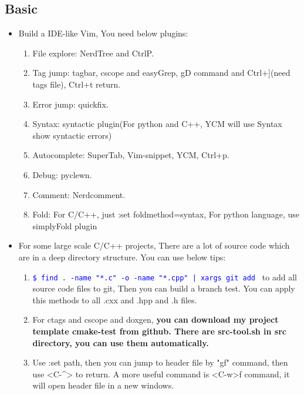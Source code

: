 \documentclass[a4paper,12pt,twoside]{book}
\newcommand{\linuxcommand}[1]{\texttt{\textcolor{blue}{\$ #1 \Pisymbol{psy}{191}}}}
\begin{document}
\subsection{Basic}
\begin{itemize}
		\item Build a IDE-like Vim, You need below plugins:
		\begin{enumerate}
				\item File explore: NerdTree and CtrlP.

				\item Tag jump: tagbar, cscope and easyGrep, gD command and Ctrl+](need tags file), Ctrl+t return.

				\item Error jump: quickfix.

				\item Syntax: syntactic plugin(For python and C++, YCM will use Syntax show syntactic errors)

				\item Autocomplete: SuperTab, Vim-snippet, YCM, Ctrl+p.

				\item Debug: pyclewn.

				\item Comment: Nerdcomment.

				\item Fold: For C/C++, just :set foldmethod=syntax, For python language, use simplyFold plugin 
		\end{enumerate}

	\item For some large scale C/C++ projects, There are a lot of source code which are in a deep directory structure. You can use below tips:

\begin{enumerate}
		\item \linuxcommand{find . -name "*.c" -o -name "*.cpp" | xargs git add} to add all source code files to git, Then you can build a branch test. You can apply this methods to all .cxx and .hpp and .h files. 
				
		\item For ctags and cscope and doxgen, \textbf{you can download my project template cmake-test from github. There are src-tool.sh in src directory, you can use them automatically.}

		\item Use :set path, then you can jump to header file by "gf" command, then use <C-\^{}> to return. A more useful command is <C-w>f command, it will open header file in a new windows.  


\end{enumerate}
\end{itemize}
\end{document}
